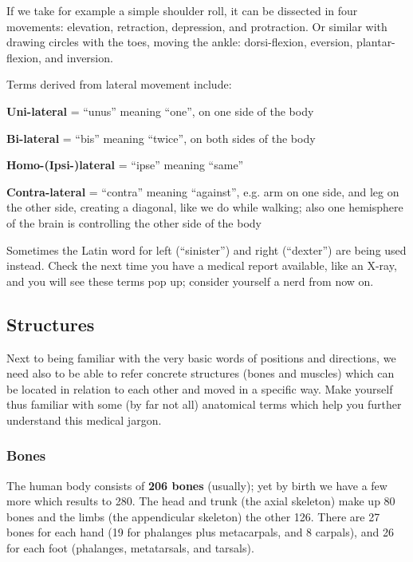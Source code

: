 If we take for example a simple shoulder roll, it can be dissected in four movements: elevation, retraction, depression, and protraction.
Or similar with drawing circles with the toes, moving the ankle: dorsi-flexion, eversion, plantar-flexion, and inversion.

Terms derived from lateral movement include:

\begin{itemize*}
    \item \textbf{Uni-lateral} = ``unus'' meaning ``one'', on one side of the body
    \item \textbf{Bi-lateral} = ``bis'' meaning ``twice'', on both sides of the body
    \item \textbf{Homo-(Ipsi-)lateral} = ``ipse'' meaning ``same''
    \item \textbf{Contra-lateral} = ``contra'' meaning ``against'', e.g. arm on one side, and leg on the other side, creating a diagonal, like we do while walking; also one hemisphere of the brain is controlling the other side of the body
\end{itemize*}

Sometimes the Latin word for left (``sinister'') and right (``dexter'') are being used instead.
Check the next time you have a medical report available, like an X-ray, and you will see these terms pop up; consider yourself a nerd from now on.

\subsection{Structures}\label{subsec:structures}

Next to being familiar with the very basic words of positions and directions, we need also to be able to refer concrete structures (bones and muscles) which can be located in relation to each other and moved in a specific way.
Make yourself thus familiar with some (by far not all) anatomical terms which help you further understand this medical jargon.

\subsubsection{Bones}

The human body consists of \textbf{206 bones} (usually); yet by birth we have a few more which results to 280.
The head and trunk (the axial skeleton) make up 80 bones and the limbs (the appendicular skeleton) the other 126.
There are 27 bones for each hand (19 for phalanges plus metacarpals, and 8 carpals), and 26 for each foot (phalanges, metatarsals, and tarsals).

